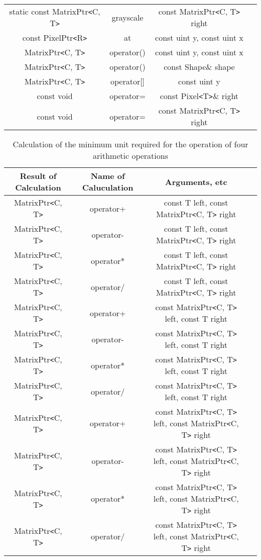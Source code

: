 \documentclass{jsarticle}
\begin{document}
\begin{table}[htb]
\begin{tabular} {|c|c|c|c|}
	static const MatrixPtr\verb*|<|C, T\verb*|>| & grayscale & const MatrixPtr\verb*|<|C, T\verb*|>| right \\
	const PixelPtr\verb*|<|R\verb*|>| & at & const uint y, const uint x \\
	MatrixPtr\verb*|<|C, T\verb*|>| & operator() & const uint y, const uint x \\
	MatrixPtr\verb*|<|C, T\verb*|>| & operator() & const Shape\& shape \\
	MatrixPtr\verb*|<|C, T\verb*|>| & operator[] & const uint y \\
	const void & operator= & const Pixel\verb*|<|T\verb*|>|\& right \\
	const void & operator= & const MatrixPtr\verb*|<|C, T\verb*|>| right \\ \hline
  \end{tabular}
\end{table}

\begin{table}[htb]
  \caption{Calculation of the minimum unit required for the operation of four arithmetic operations}
  \begin{tabular} {|c|c|c|c|} \hline
	Result of Calculation & Name of Caluculation & Arguments, etc \\ \hline
	MatrixPtr\verb*|<|C, T\verb*|>| & operator+ & const T left, const MatrixPtr\verb*|<|C, T\verb*|>| right \\
	MatrixPtr\verb*|<|C, T\verb*|>| & operator- & const T left, const MatrixPtr\verb*|<|C, T\verb*|>| right \\
	MatrixPtr\verb*|<|C, T\verb*|>| & operator* & const T left, const MatrixPtr\verb*|<|C, T\verb*|>| right \\
	MatrixPtr\verb*|<|C, T\verb*|>| & operator/ & const T left, const MatrixPtr\verb*|<|C, T\verb*|>| right \\
	MatrixPtr\verb*|<|C, T\verb*|>| & operator+ & const MatrixPtr\verb*|<|C, T\verb*|>| left, const T right \\
	MatrixPtr\verb*|<|C, T\verb*|>| & operator- & const MatrixPtr\verb*|<|C, T\verb*|>| left, const T right \\
	MatrixPtr\verb*|<|C, T\verb*|>| & operator* & const MatrixPtr\verb*|<|C, T\verb*|>| left, const T right \\
	MatrixPtr\verb*|<|C, T\verb*|>| & operator/ & const MatrixPtr\verb*|<|C, T\verb*|>| left, const T right \\
	MatrixPtr\verb*|<|C, T\verb*|>| & operator+ & const MatrixPtr\verb*|<|C, T\verb*|>| left, const MatrixPtr\verb*|<|C, T\verb*|>| right \\
	MatrixPtr\verb*|<|C, T\verb*|>| & operator- & const MatrixPtr\verb*|<|C, T\verb*|>| left, const MatrixPtr\verb*|<|C, T\verb*|>| right \\
	MatrixPtr\verb*|<|C, T\verb*|>| & operator* & const MatrixPtr\verb*|<|C, T\verb*|>| left, const MatrixPtr\verb*|<|C, T\verb*|>| right \\
	MatrixPtr\verb*|<|C, T\verb*|>| & operator/ & const MatrixPtr\verb*|<|C, T\verb*|>| left, const MatrixPtr\verb*|<|C, T\verb*|>| right \\ \hline
  \end{tabular}
\end{table}
\end{document}
